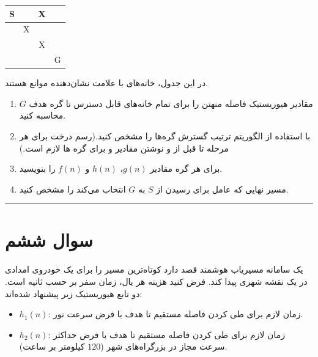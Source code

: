 \documentclass[a4paper,10pt]{article}
\begin{document}
\begin{center}
	\begin{tabular}{|c|c|c|c|}
		\hline
		S &  & X &  \\
		\hline
		& X &  &  \\
		\hline
		&  & X &  \\
		\hline
		&  &  & G \\
		\hline
	\end{tabular}
\end{center}

در این جدول، خانه‌های با علامت  نشان‌دهنده موانع هستند.

\begin{enumerate}
	
	\item
	مقادیر هیوریستیک فاصله منهتن را برای تمام خانه‌های قابل دسترس تا گره هدف $G$ محاسبه کنید.
	
	\item
	با استفاده از الگوریتم  ترتیب گسترش گره‌ها را مشخص کنید.(رسم درخت برای هر مرحله تا قبل از  و نوشتن مقادیر  و  برای گره ها لازم است.) 
	
	\item
	برای هر گره مقادیر $g(n)$، $h(n)$ و $f(n)$ را بنویسید.
	
	\item
	مسیر نهایی که عامل برای رسیدن از $S$ به $G$ انتخاب می‌کند را مشخص کنید.
	
\end{enumerate}


\bigskip
\textcolor{AccentCyan}{\rule{\linewidth}{0.4pt}}
\section{\textcolor{AccentGold}{سوال ششم }}

یک سامانه مسیریاب هوشمند قصد دارد کوتاه‌ترین مسیر را برای یک خودروی امدادی در یک نقشه شهری پیدا کند. فرض کنید هزینه هر یال، زمان سفر بر حسب ثانیه است. دو تابع هیوریستیک زیر پیشنهاد شده‌اند:

\begin{itemize}
	\item $h_1(n)$: زمان لازم برای طی کردن فاصله مستقیم تا هدف با فرض سرعت نور.
	\item $h_2(n)$: زمان لازم برای طی کردن فاصله مستقیم تا هدف با فرض حداکثر سرعت مجاز در بزرگراه‌های شهر ($120$ کیلومتر بر ساعت).
\end{itemize}
\end{document}
